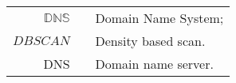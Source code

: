 \begin{center}
	\begin{tabular}[t]{rp{5mm}p{12cm}}
		$\mathbb{DNS}$ & & Domain Name System; \\
		${DBSCAN}$ & & Density based scan.\\
        DNS & & Domain name server.
  
	\end{tabular}
 
\end{center}
